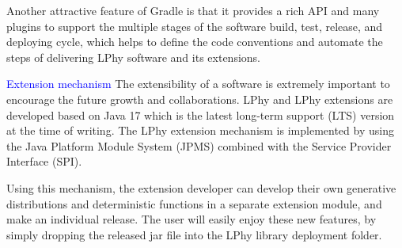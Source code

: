 \documentclass[10pt,letterpaper,table]{article}
\begin{document}
{Another attractive feature of Gradle is that it provides a rich API and many plugins to support the multiple stages of the software build, test, release, and deploying cycle, which helps to define the code conventions and automate the steps of delivering LPhy software and its extensions.  

\textcolor{blue}{Extension mechanism}
The extensibility of a software is extremely important to encourage the future growth and collaborations. 
LPhy and LPhy extensions are developed based on Java 17 which is the latest long-term support (LTS) version at the time of writing. 
The LPhy extension mechanism is implemented by using the Java Platform Module System (JPMS) combined with the Service Provider Interface (SPI).

Using this mechanism, the extension developer can develop their own generative distributions and deterministic functions in a separate extension module, and make an individual release.
The user will easily enjoy these new features, by simply dropping the released jar file into the LPhy library deployment folder.



}
\end{document}

